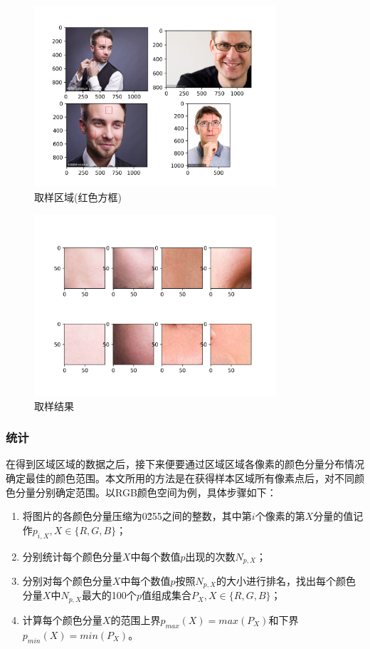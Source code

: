 \documentclass[a4paper]{ctexart}
\begin{document}
\begin{spacing}{1.5}
\begin{figure}[htbp]
	\centering
	\includegraphics [width=0.8\textwidth]{figure//spa.png}
	\caption{取样区域(红色方框)}\label{spa}
\end{figure}
\begin{figure}[htbp]
	\centering
	\includegraphics [width=0.8\textwidth]{figure//sp.png}
	\caption{取样结果}\label{sp}
\end{figure}
\subsubsection{统计}
在得到区域区域的数据之后，接下来便要通过区域区域各像素的颜色分量分布情况确定最佳的颜色范围。本文所用的方法是在获得样本区域所有像素点后，对不同颜色分量分别确定范围。以RGB颜色空间为例，具体步骤如下：
\begin{enumerate}
	\item 将图片的各颜色分量压缩为0\~255之间的整数，其中第$i$个像素的第$X$分量的值记作$p_{i,X},X\in\{R,G,B\}$；
	\item 分别统计每个颜色分量$X$中每个数值$p$出现的次数$N_{p,X}$；
	\item 分别对每个颜色分量$X$中每个数值$p$按照$N_{p,X}$的大小进行排名，找出每个颜色分量$X$中$N_{p,X}$最大的100个$p$值组成集合$P_{X},X\in\{R,G,B\}$；
	\item 计算每个颜色分量$X$的范围上界$p_{max}(X)=max(P_{X})$和下界$p_{min}(X)=min(P_{X})$。
\end{enumerate}

\end{spacing}
\end{document}
